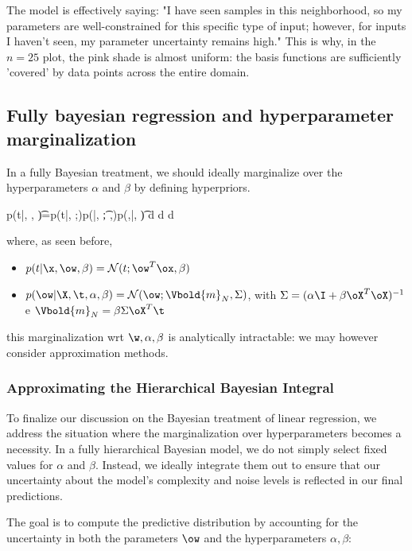 The model is effectively saying: "I have seen samples in this neighborhood, so my parameters are well-constrained for this specific type of input; however, for inputs I haven't seen, my parameter uncertainty remains high." This is why, in the $n=25$ plot, the pink shade is almost uniform: the basis functions are sufficiently 'covered' by data points across the entire domain.

\subsection*{Fully bayesian regression and hyperparameter marginalization}
In a fully Bayesian treatment, we should ideally marginalize over the hyperparameters $\alpha$ and $\beta$ by defining hyperpriors.
\begin{myequation}
p(t|\x, \X, \t)=\int p(t|\x, \ow;\beta)p(\ow|\X, \t; \alpha,\beta)p(\alpha,\beta|\X, \t)\; d\ow\; d\alpha\; d\beta
\end{myequation}
where, as seen before,
\begin{itemize}
\item $p(t|\x, \ow,\beta)=\mathcal{N} (t; \ow^T\ox, \beta)$
\item $p(\ow|\X, \t, \alpha,\beta)=\mathcal{N}(\ow;\Vbold{m}_N,\Sigma)$, with $\Sigma=(\alpha\I+\beta\oX^T\oX)^{-1}$ e $\Vbold{m}_N=\beta\Sigma\oX^T\t$
\end{itemize}
this marginalization wrt $\w,\alpha,\beta$ is analytically intractable:
we may however consider approximation methods. 




\subsubsection*{Approximating the Hierarchical Bayesian Integral}

To finalize our discussion on the Bayesian treatment of linear regression, we address the situation where the marginalization over hyperparameters becomes a necessity. In a fully hierarchical Bayesian model, we do not simply select fixed values for $\alpha$ and $\beta$. Instead, we ideally integrate them out to ensure that our uncertainty about the model's complexity and noise levels is reflected in our final predictions.

The goal is to compute the \alert{predictive distribution} by accounting for the uncertainty in both the parameters $\ow$ and the hyperparameters $\alpha, \beta$:


